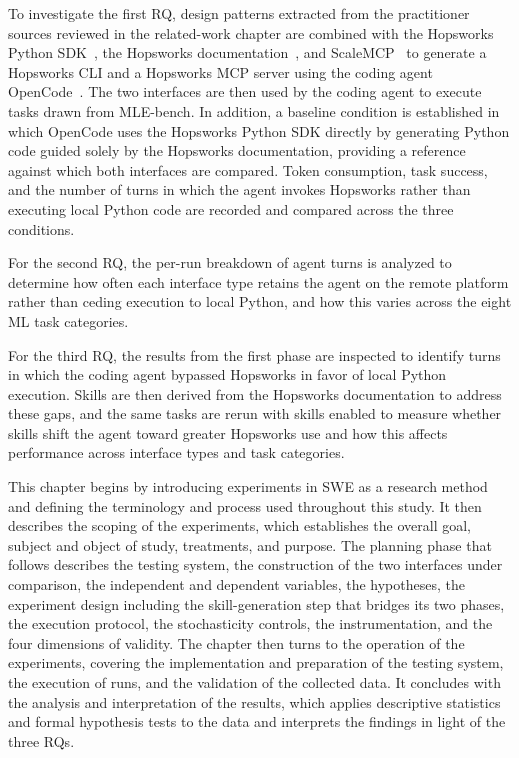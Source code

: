 \documentclass[
english,                 %
bibtex,                  %
includeExtraAbstracts, %
]{kththesis}
\numberwithin{listing}{chapter}
\begin{document}
To investigate the first \gls{RQ}, design patterns extracted from the practitioner sources reviewed in the related-work chapter are combined with the Hopsworks Python \gls{SDK}~\cite{hopsworks_ab_logicalclockshopsworks-api_2026}, the Hopsworks documentation~\cite{hopsworks_ab_hopsworks_2026}, and Scale\gls{MCP}~\cite{marcelloni_scalemcp_2026} to generate a Hopsworks \gls{CLI} and a Hopsworks \gls{MCP} server using the coding agent OpenCode~\cite{anomaly_innovations_inc_anomalycoopencode_2026}. The two interfaces are then used by the coding agent to execute tasks drawn from \gls{MLE}-bench. In addition, a baseline condition is established in which OpenCode uses the Hopsworks Python \gls{SDK} directly by generating Python code guided solely by the Hopsworks documentation, providing a reference against which both interfaces are compared. Token consumption, task success, and the number of turns in which the agent invokes Hopsworks rather than executing local Python code are recorded and compared across the three conditions.

For the second \gls{RQ}, the per-run breakdown of agent turns is analyzed to determine how often each interface type retains the agent on the remote platform rather than ceding execution to local Python, and how this varies across the eight \gls{ML} task categories.

For the third \gls{RQ}, the results from the first phase are inspected to identify turns in which the coding agent bypassed Hopsworks in favor of local Python execution. Skills are then derived from the Hopsworks documentation to address these gaps, and the same tasks are rerun with skills enabled to measure whether skills shift the agent toward greater Hopsworks use and how this affects performance across interface types and task categories.

This chapter begins by introducing experiments in \gls{SWE} as a research method and defining the terminology and process used throughout this study. It then describes the scoping of the experiments, which establishes the overall goal, subject and object of study, treatments, and purpose. The planning phase that follows describes the testing system, the construction of the two interfaces under comparison, the independent and dependent variables, the hypotheses, the experiment design including the skill-generation step that bridges its two phases, the execution protocol, the stochasticity controls, the instrumentation, and the four dimensions of validity. The chapter then turns to the operation of the experiments, covering the implementation and preparation of the testing system, the execution of runs, and the validation of the collected data. It concludes with the analysis and interpretation of the results, which applies descriptive statistics and formal hypothesis tests to the data and interprets the findings in light of the three \glspl{RQ}.
\end{document}
